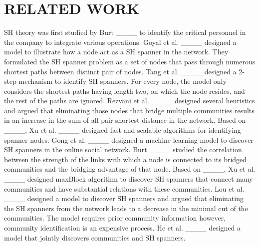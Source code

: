\section{RELATED WORK}
SH theory was first studied by Burt ____ to identify the critical personnel in the company to integrate various operations. Goyal et al. ____ designed a model to illustrate how a node act as a SH spanner in the network. They formulated the SH spanner problem as a set of nodes that pass through numerous shortest paths between distinct pair of nodes. Tang et al. ____ designed a 2-step mechanism to identify SH spanners. For every node, the model only considers the shortest paths having length two, on which the node resides, and the rest of the paths are ignored. Rezvani et al. ____ designed several heuristics and argued that eliminating those nodes that bridge multiple communities results in an increase in the sum of all-pair shortest distance in the network. Based on ____, Xu et al. ____ designed fast and scalable algorithms for identifying spanner nodes. Gong et al. ____ designed a machine learning model to discover SH spanners in the online social network. Burt ____ studied the correlation between the strength of the links with which a node is connected to its bridged communities and the bridging advantage of that node. Based on ____, Xu et al. ____ designed maxBlock algorithm to discover SH spanners that connect many communities and have substantial relations with these communities. Lou et al. ____ designed a model to discover SH spanners and argued that eliminating the SH spanners from the network leads to a decrease in the minimal cut of the communities. The model requires prior community information however, community identification is an expensive process. He et al. ____ designed a model that jointly discovers communities and SH spanners.